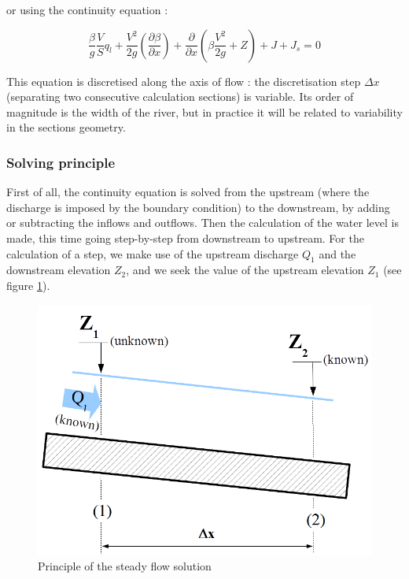 or using the continuity equation :

\begin{equation}
\frac{\beta}{g} \frac{V}{S} q_l + \frac{V^2}{2 g} \left ( \frac{\partial \beta}{\partial x} \right ) + \frac{\partial}{\partial x} \left ( \beta \frac{V^2}{2 g} + Z \right ) + J + J_s = 0
\end{equation}

This equation is discretised along the axis of flow : the discretisation step $\Delta	x$ (separating two consecutive calculation sections) is variable. Its order of magnitude is the width of the river, but in practice it will be related to variability in the sections geometry.

\subsubsection{Solving principle}

First of all, the continuity equation is solved from the upstream (where the discharge is imposed by the boundary condition) to the downstream, by adding or subtracting the inflows and outflows. Then the calculation of the water level is made, this time going step-by-step from downstream to upstream. For the calculation of a step, we make use of the upstream discharge $Q_1$ and the downstream elevation $Z_2$, and we seek the value of the upstream elevation $Z_1$ (see figure \ref{fig:PRP}).

\begin{figure}[H]
 \begin{center}
  \includegraphics[width=\textwidth]{Figures/Principe_Res_Perm.png}
  \caption{Principle of the steady flow solution}
  \label{fig:PRP}
 \end{center}
\end{figure}

